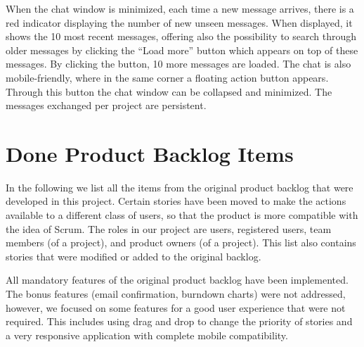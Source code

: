 \documentclass[
	accentcolor=tud1a %
]{tudreport}
\begin{document}
When the chat window is minimized, each time a new message arrives, there is a red indicator displaying the number of new unseen messages. When displayed, it shows the 10 most recent messages, offering also the possibility to search through older messages by clicking the ``Load more'' button which appears on top of these messages. By clicking the button, 10 more messages are loaded. The chat is also mobile-friendly, where in the same corner a floating action button appears. Through this button the chat window can be collapsed and minimized. The messages exchanged per project are persistent. 


\chapter{Done Product Backlog Items}
\label{ch:done-pbis}

In the following we list all the items from the original product backlog that were developed in this project. Certain stories have been moved to make the actions available to a different class of users, so that the product is more compatible with the idea of Scrum. The roles in our project are users, registered users, team members (of a project), and product owners (of a project). This list also contains stories that were modified or added to the original backlog.

All mandatory features of the original product backlog have been implemented. The bonus features (email confirmation, burndown charts) were not addressed, however, we focused on some features for a good user experience that were not required. This includes using drag and drop to change the priority of stories and a very responsive application with complete mobile compatibility.
\end{document}
